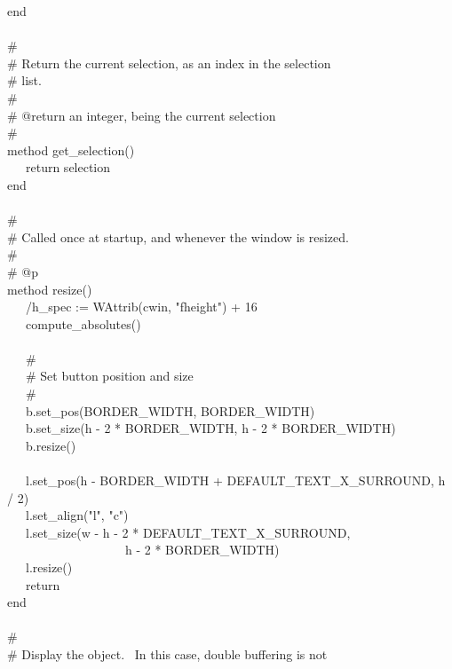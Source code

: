{\>   end \\
\ \\
\>   \# \\
\>   \# Return the current selection, as an index in the selection \\
\>   \# list. \\
\>   \# \\
\>   \# @return an integer, being the current selection \\
\>   \# \\
\>   method get\_selection() \\
\>   \ \ \ return selection \\
\>   end \\
\ \\
\>   \# \\
\>   \# Called once at startup, and whenever the window is resized. \\
\>   \# \\
\>   \# @p \\
\>   method resize() \\
\>   \ \ \ /h\_spec := WAttrib(cwin,
"fheight") + 16 \\
\>   \ \ \ compute\_absolutes() \\
\ \\
\>   \ \ \ \# \\
\>   \ \ \ \# Set button position and size \\
\>   \ \ \ \# \\
\>   \ \ \ b.set\_pos(BORDER\_WIDTH, BORDER\_WIDTH) \\
\>   \ \ \ b.set\_size(h - 2 * BORDER\_WIDTH, h - 2 *
BORDER\_WIDTH) \\
\>   \ \ \ b.resize() \\
\ \\
\>   \ \ \ l.set\_pos(h - BORDER\_WIDTH +
DEFAULT\_TEXT\_X\_SURROUND, h / 2) \\
\>   \ \ \ l.set\_align("l",
"c") \\
\>   \ \ \ l.set\_size(w - h - 2 *
DEFAULT\_TEXT\_X\_SURROUND, \\
\>   \ \ \ \ \ \ \ \ \ \ \ \ \ \ \ \ \ \ \ h - 2 * BORDER\_WIDTH) \\
\>   \ \ \ l.resize() \\
\>   \ \ \ return \\
\>   end \\
\ \\
\>   \# \\
\>   \# Display the object. \ In this case, double buffering is not \\
}
